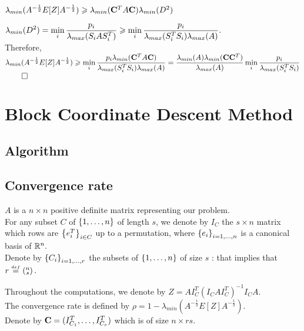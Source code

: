 $\lambda_{min}(A^{-\frac12}E[Z]A^{-\frac12} ) \geq \lambda_{min}(\bold{C}^{T}A \bold{C} ) \lambda_{min}(D^{2})$

$\dsp \lambda_{min}(D^{2}) =  \min_{i}  \frac{p_{i}}{\lambda_{max}(S_{i} A S_{i}^{T} ) } \geq  \min_{i}\frac{p_{i} }{\lambda_{max}(S_{i}^{T} S_{i}) \lambda_{max}(A)}.$\\
 Therefore, 
$\dsp \lambda_{min}(A^{-\frac12}E[Z]A^{-\frac12} ) \geq  \min_{i}  \frac{p_{i} \lambda_{min}(\bold{C}^{T}A \bold{C} )}{\lambda_{max}(S_{i}^{T} S_{i}) \lambda_{max}(A) }  =  \frac{\lambda_{min}(A) \lambda_{min}(\bold{C} \bold{C}^{T} )}{ \lambda_{max}(A)} \min_{i} \frac{p_{i}}{\lambda_{max}(S_{i}^{T} S_{i})}$
$\qed$



\chapter{Block Coordinate Descent Method} \label{newton}



\section{Algorithm}

\section{Convergence rate}

$A$ is a $n \times n$ positive definite matrix representing our problem.\\ 
For any subset $C$ of $\acco{1,\dots,n}$ of length $s$, we denote by $I_{C}$ the $s\times n$ matrix which rows are $\acco{e_{i}^{T}}_{i\in C}$ up to a permutation, where $\acco{e_{i}}_{i=1,\dots,n}$ is a canonical basis of $\R^{n}.$\\ 
Denote by $\acco{C_{i}}_{i=1,\dots,r}$ the subsets of $\acco{1,\dots,n}$ of size $s$ : that implies that $\dsp r \egaldef  \pare{\substack{n \\ s}}.$
 
Throughout the computations, we denote by $Z = A I_{C}^{T} (I_{C} A I_{C}^{T})^{-1} I_{C} A$.\\

The convergence rate is defined by $\rho = 1 - \lambda_{min}(A^{-\frac12}E[Z]A^{-\frac12}  )$.\\


Denote by $\bold{C} = (I_{C_{1}}^{T},\dots,I_{C_{r}}^{T})$ which is of size $ n \times r s$.\\
 
